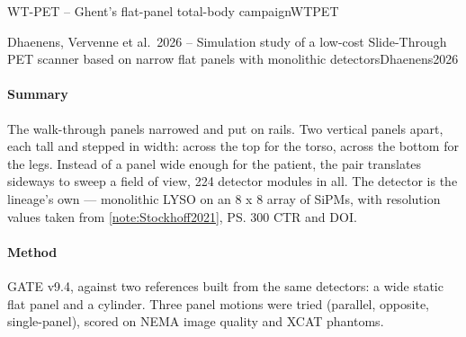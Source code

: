 \begin{programnote}{WT-PET -- Ghent's flat-panel total-body campaign}{WTPET}
\begin{papernote}{Dhaenens, Vervenne et al.\ 2026 -- Simulation study of a low-cost Slide-Through PET scanner based on narrow flat panels with monolithic detectors}{Dhaenens2026}
\paragraph{Summary}
The walk-through panels narrowed and put on rails. Two vertical panels
 apart, each  tall and stepped in width:  across the
top for the torso,  across the bottom for the legs. Instead of a panel
wide enough for the patient, the pair translates sideways to sweep a
 field of view, 224 detector modules in all. The detector is the
lineage's own ---  monolithic LYSO on an 8 x 8
array of  SiPMs, with resolution values taken from
\ref{note:Stockhoff2021}, \ps{300} CTR and  DOI.

\paragraph{Method}
GATE v9.4, against two references built from the same detectors: a wide static
flat panel and a cylinder. Three panel motions were tried (parallel, opposite,
single-panel), scored on NEMA image quality and XCAT phantoms.


\end{papernote}
\end{programnote}

